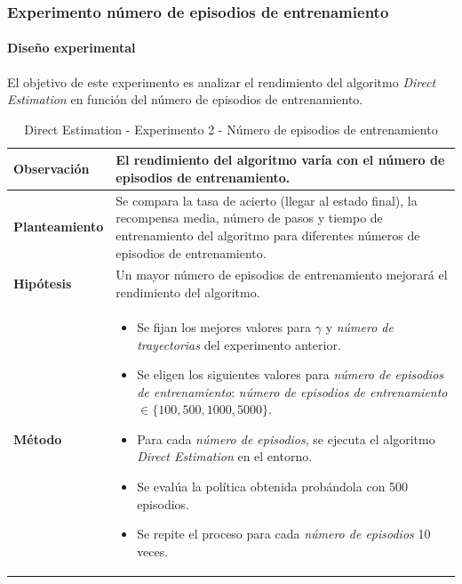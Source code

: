 \subsubsection{Experimento número de episodios de entrenamiento}

\paragraph{Diseño experimental}

El objetivo de este experimento es analizar el rendimiento del algoritmo \textit{Direct Estimation} en función del número de episodios de entrenamiento.

\begin{table}[H]
    \centering
    \begin{tabularx}{\textwidth}{|p{4cm}|X|} %
        \hline %
        \textbf{Observación} & El rendimiento del algoritmo varía con el número de episodios de entrenamiento.
        \\ \hline
        \textbf{Planteamiento} & Se compara la tasa de acierto (llegar al estado final), la recompensa media, número de pasos y tiempo de entrenamiento del algoritmo para diferentes números de episodios de entrenamiento.
        \\ \hline
        \textbf{Hipótesis} & Un mayor número de episodios de entrenamiento mejorará el rendimiento del algoritmo.
        \\ \hline
        \textbf{Método} & 
        \begin{itemize}
            \item Se fijan los mejores valores para \(\gamma\) y \textit{número de trayectorias} del experimento anterior.
            \item Se eligen los siguientes valores para \textit{número de episodios de entrenamiento}: \textit{número de episodios de entrenamiento} \(\in \{100, 500, 1000, 5000\}\).
            \item Para cada \textit{número de episodios}, se ejecuta el algoritmo \textit{Direct Estimation} en el entorno.
            \item Se evalúa la política obtenida probándola con 500 episodios.
            \item Se repite el proceso para cada \textit{número de episodios} 10 veces.
        \end{itemize}
        \\ \hline
    \end{tabularx}
    \caption{Direct Estimation - Experimento 2 - Número de episodios de entrenamiento}
    \label{tab:diseñoDirectEstimationExp2}
\end{table}

